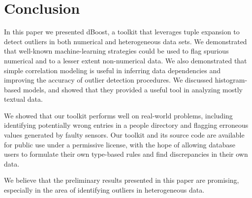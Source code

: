 \section{Conclusion}
\label{sec:conclusion}

In this paper we presented dBoost, a toolkit that leverages tuple expansion to detect outliers in both numerical and heterogeneous data sets. We demonstrated that well-known machine-learning strategies could be used to flag spurious numerical and to a lesser extent non-numerical data. We also demonstrated that simple correlation modeling is useful in inferring data dependencies and improving the accuracy of outlier detection procedures. We discussed histogram-based models, and showed that they provided a useful tool in analyzing mostly textual data.

We showed that our toolkit performs well on real-world problems, including identifying potentially wrong entries in a people directory and flagging erroneous values generated by faulty sensors. Our toolkit and its source code are available for public use under a permissive license, with the hope of allowing database users to formulate their own type-based rules and find discrepancies in their own data.

We believe that the preliminary results presented in this paper are promising, especially in the area of identifying outliers in heterogeneous data.

